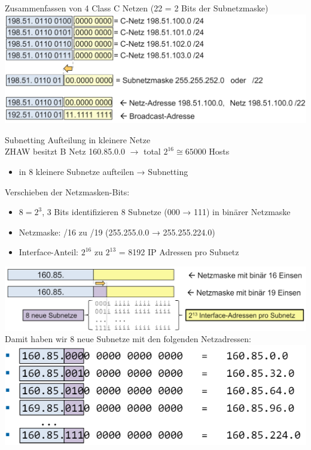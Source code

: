 \begin{example}
    Zusammenfassen von 4 Class C Netzen (22 = 2 Bits der Subnetzmaske)\\
        \includegraphics[width=1\linewidth]{images/example_supernetting.png}
\end{example}

\begin{concept}{Subnetting}
    Aufteilung in kleinere Netze\\
    ZHAW besitzt B Netz 160.85.0.0 $\rightarrow$ total $2^{16} \cong 65000$  Hosts
    \begin{itemize}
        \item in 8 kleinere Subnetze aufteilen → Subnetting
    \end{itemize}
    Verschieben der Netzmasken-Bits: 
    \begin{itemize}
        \item $8 = 2^3$, 3 Bits identifizieren 8 Subnetze (000 → 111) in binärer Netzmaske
        \item Netzmaske: /16 zu /19 (255.255.0.0 → 255.255.224.0)
        \item Interface-Anteil: $2^{16}$ zu $2^{13}$ = 8192 IP Adressen pro Subnetz
    \end{itemize}
        \includegraphics[width=1\linewidth]{images/subnetting1.png}\\
    Damit haben wir 8 neue Subnetze mit den folgenden Netzadressen:\\
        \includegraphics[width=0.75\linewidth]{images/subnetting2.png}

\end{concept}
